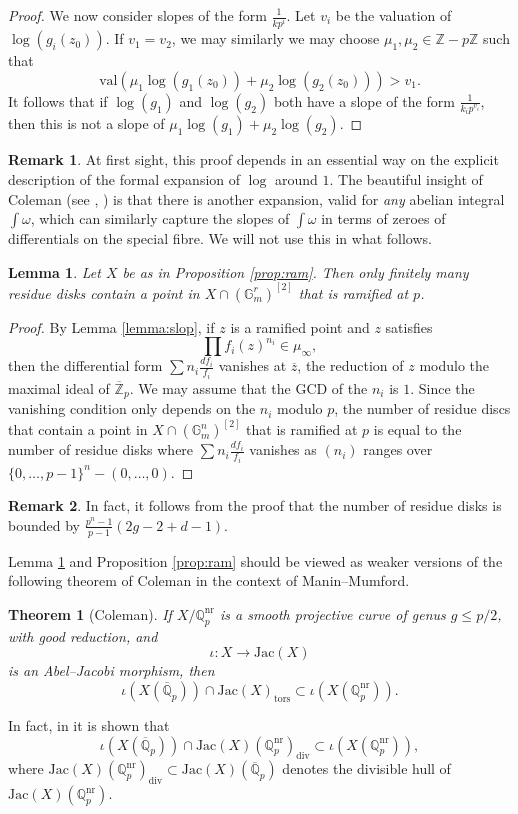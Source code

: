 \documentclass{amsart}
\def\Z{\mathbb Z}
\def\Q{\mathbb Q}
\newcommand{\divv}{\mathrm{div}}
\newcommand{\val}{\mathrm{val}}
\newtheorem{theorem}{Theorem}
\newtheorem{lemma}{Lemma}
\theoremstyle{definition}
\newtheorem{remark}{Remark}
\newcommand{\tors}{\mathrm{tors}}
\newcommand{\Jac}{\mathrm{Jac}}
\begin{document}
\begin{proof}
We now consider slopes of the form $\frac{1}{kp^i}$. Let $v_i$ be the valuation of $\log (g_i (z_0 ))$. If $v_1 =v_2$, we may similarly we may choose $\mu _1 ,\mu _2 \in \Z -p\Z $ such that 
\[
\val (\mu _1 \log (g_1 (z_0 ))+\mu _2 \log (g_2 (z_0 )))>v_1 .
\]
It follows that if $\log (g_1 )$ and $\log (g_2 )$ both have a slope of the form $\frac{1}{k_i p^{v_i }}$, then this is not a slope of $\mu _1 \log (g_1 )+\mu _2 \log (g_2 )$.
\end{proof}
\begin{remark}
At first sight, this proof depends in an essential way on the explicit description of the formal expansion of $\log $ around $1$. The beautiful insight of Coleman (see \cite{coleman:ramified}, \cite{DP}) is that there is another expansion, valid for \textit{any} abelian integral $\int \omega $, which can similarly capture the slopes of $\int \omega $ in terms of zeroes of differentials on the special fibre. We will not use this in what follows.
\end{remark}

\begin{lemma}\label{lemma:fin}
Let $X$ be as in Proposition \ref{prop:ram}. Then only finitely many residue disks contain a point in $X\cap (\mathbb{G}_m ^r )^{[2]}$ that is ramified at $p$.
\end{lemma}
\begin{proof}
By Lemma \ref{lemma:slop}, if $z$ is a ramified point and $z$ satisfies 
\[
\prod f_i (z)^{n_i }\in \mu _{\infty },
\]
then the differential form
$
\sum n_i \frac{df_i }{f_i }
$ 
vanishes at $\overline{z}$, the reduction of $z$ modulo the maximal ideal of $\overline{\Z }_p $. We may assume that the GCD of the $n_i $ is $1$. Since the vanishing condition only depends on the $n_i$ modulo $p$, the number of residue discs that contain a point in $X\cap (\mathbb{G}_m ^n )^{[2]}$ that is ramified at $p$ is equal to the number of residue disks where $\sum n_i \frac{df_i }{f_i }$ vanishes as $(n_i )$ ranges over $\{ 0,\ldots ,p-1\}^n -(0,\ldots ,0)$.
\end{proof}
\begin{remark}
In fact, it follows from the proof that the number of residue disks is bounded by $\frac{p^n-1}{p-1}(2g-2+d-1)$.
\end{remark}
Lemma \ref{lemma:fin} and Proposition \ref{prop:ram} should be viewed as weaker versions of the following theorem of Coleman \cite{coleman:ramified} in the context of Manin--Mumford.
\begin{theorem}[Coleman]\label{thm:CRMM}
If $X/\Q _p ^{\mathrm{nr}}$ is a smooth projective curve of genus $g\leq p/2$, with good reduction, and 
\[
\iota :X\to \Jac (X)
\]
is an Abel--Jacobi morphism, then 
\[
\iota (X(\overline{\Q }_p ))\cap \Jac (X)_{\tors }\subset \iota (X(\Q _p ^{\mathrm{nr}})).
\]
\end{theorem}
In fact, in \cite{DP} it is shown that 
\[
\iota (X(\overline{\Q }_p ))\cap \Jac (X)(\Q _p ^{\mathrm{nr}})_{\divv }\subset \iota (X(\Q _p ^{\mathrm{nr}})),
\]
where $\Jac (X)(\Q _p ^{\mathrm{nr}})_{\divv }\subset \Jac (X)(\overline{\Q }_p )$ denotes the divisible hull of $\Jac (X)(\Q _p ^{\mathrm{nr}})$.
\end{document}
